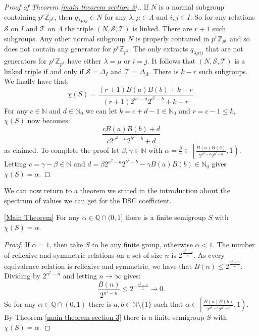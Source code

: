 \documentclass[a4paper, 12pt,reqno]{amsart}
\theoremstyle{plain}
\theoremstyle{definition}
\theoremstyle{remark}
\newcommand{\N}{\mathbb{N}}
\newcommand{\Z}{\mathbb{Z}}
\newcommand{\Q}{\mathbb{Q}}
\begin{document}
\begin{proof}[Proof of Theorem \ref{main theorem section 3}.]
    If $N$ is a normal subgroup containing $p^r \Z_{p^k}$, then $q_{\lambda \mu i j} \in N$ for any $\lambda,\mu \in \Lambda$ and $i,j \in I$.
    So for any relations $\mathcal{S}$ on $I$ and $\mathcal{T}$ on $\Lambda$ the triple $(N,\mathcal{S},\mathcal{T})$ is linked.
    There are $r+1$ such subgroups.
    Any other normal subgroup $N$ is properly contained in $p^r \Z_{p^k}$ and so does not contain any generator for $p^r\Z_{p^k}$.
    The only extracts $q_{\lambda \mu i j}$ that are not generators for $p^r \Z_{p^k}$ have either $\lambda = \mu$ or $i =j$.
    It follows that $(N,\mathcal{S}, \mathcal{T})$ is a linked triple if and only if $\mathcal{S} = \Delta_I$ and $\mathcal{T} = \Delta_\Lambda$.
    There is $k-r$ such subgroups.
    We finally have that:
    \begin{equation}
        \label{rees matrix construction}
        \chi(S) = \frac{(r+1) B(a)B(b) + k-r}{(r+1)2^{a^2 - a} 2^{b^2 - b} + k - r}.
    \end{equation}
    For any $c \in \N$ and $d \in \N_0$ we can let $k = c+d - 1 \in \N_0$ and $r = c - 1 \leq k$, $\chi(S)$ now becomes:
    \begin{equation*}
        \frac{cB(a)B(b)+ d}{c 2^{a^2 - a} 2^{b^2 - b} + d}
    \end{equation*}
    as claimed.
    To complete the proof let $\beta ,\gamma \in \N$ with $\alpha = \frac{\beta}{\gamma}\in \left[ \frac{B(a)B(b)}{2^{a^2 - a}2^{b^2 - b}} , 1\right) $.
    Letting $c = \gamma - \beta \in \N$ and $d = \beta 2^{a^2 - a} 2^{b^2 - b} - \gamma B(a) B(b) \in \N_0$
    gives $\chi(S) = \alpha$.
\end{proof}

We can now return to a theorem we stated in the introduction about the spectrum of values we can get for the DSC coefficient.
 
\begin{reptheorem}{\ref{Main Theorem}}
    For any $\alpha \in \Q \cap (0,1]$ there is a finite semigroup $S$ with $\chi(S) = \alpha$.
\end{reptheorem}

\begin{proof}
    If $\alpha = 1$, then take $S$ to be any finite group, otherwise $\alpha < 1$. 
    The number of reflexive and symmetric relations on a set of size $n$ is $2^{\frac{n^2 - n}{2}}$.
    As every equivalence relation is reflexive and symmetric, we have that $B(n) \leq 2^{\frac{n^2 - n}{2}}$.
    Dividing by $2^{n^2 - n}$ and letting $n \rightarrow \infty$ gives:
    \begin{equation*}
        \frac{B(n)}{2^{n^2-n}} \leq 2^{-\frac{n^2-n}{2}} \rightarrow 0.
    \end{equation*}
    So for any $\alpha \in \Q \cap (0,1)$ there is $a,b \in \N \setminus \{1 \}$ such that $\alpha \in \left[ \frac{B(a)B(b)}{2^{a^2 - a}2^{b^2 - b}} , 1\right)$.
    By Theorem \ref{main theorem section 3} there is a finite semigroup $S$ with $\chi(S) = \alpha$.
\end{proof}
\end{document}

